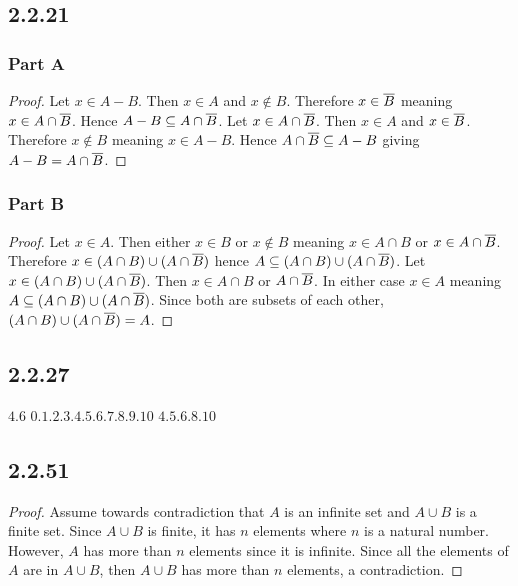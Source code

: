 \documentclass[12pt,titlepage]{extarticle}
\begin{document}
\subsection*{2.2.21}
\subsubsection*{Part A}
\begin{proof}
    Let $x \in A - B$. Then $x \in A$ and $x \notin B$. Therefore $x \in \overline{B}$ meaning $x \in A \cap \overline{B}$. Hence $A - B \subseteq A \cap \overline{B}$. Let $x \in A \cap \overline{B}$. Then $x \in A$ and $x \in \overline{B}$. Therefore $x \notin B$ meaning $x \in A - B$. Hence $A \cap \overline{B} \subseteq A - B$ giving $A - B = A \cap \overline{B}$.
\end{proof}

\subsubsection*{Part B}
\begin{proof}
    Let $x \in A$. Then either $x \in B$ or $x \notin B$ meaning $x \in A \cap B$ or $x \in A \cap \overline{B}$. Therefore $x \in (A \cap B) \cup (A \cap \overline{B})$ hence $A \subseteq (A \cap B) \cup (A \cap \overline{B})$. Let $x \in (A \cap B) \cup (A \cap \overline{B})$. Then $x \in A \cap B$ or $A \cap \overline{B}$. In either case $x \in A$ meaning $A \subseteq (A \cap B) \cup (A \cap \overline{B})$. Since both are subsets of each other, $(A \cap B) \cup (A \cap \overline{B}) = A$.
\end{proof}

\subsection*{2.2.27}
\begin{tasks}
    \task $\qty{4,6}$
    \task $\qty{0,1,2,3,4,5,6,7,8,9,10}$
    \task $\qty{4,5,6,8,10}$
\end{tasks}

\subsection*{2.2.51}
\begin{proof}
    Assume towards contradiction that $A$ is an infinite set and $A \cup B$ is a finite set. Since $A \cup B$ is finite, it has $n$ elements where $n$ is a natural number. However, $A$ has more than $n$ elements since it is infinite. Since all the elements of $A$ are in $A \cup B$, then $A \cup B$ has more than $n$ elements, a contradiction.
\end{proof}
\end{document}
